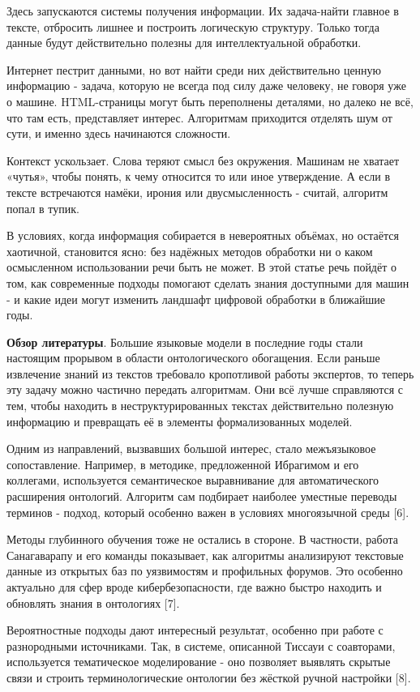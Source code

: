 \begin{multicols}{2}
Здесь запускаются системы получения информации. Их задача-найти главное
в тексте, отбросить лишнее и построить логическую структуру. Только
тогда данные будут действительно полезны для интеллектуальной обработки.

Интернет пестрит данными, но вот найти среди них действительно ценную
информацию - задача, которую не всегда под силу даже человеку, не говоря
уже о машине. HTML-страницы могут быть переполнены деталями, но далеко
не всё, что там есть, представляет интерес. Алгоритмам приходится
отделять шум от сути, и именно здесь начинаются сложности.

Контекст ускользает. Слова теряют смысл без окружения. Машинам не
хватает «чутья», чтобы понять, к чему относится то или иное утверждение.
А если в тексте встречаются намёки, ирония или двусмысленность - считай,
алгоритм попал в тупик.

В условиях, когда информация собирается в невероятных объёмах, но
остаётся хаотичной, становится ясно: без надёжных методов обработки ни о
каком осмысленном использовании речи быть не может. В этой статье речь
пойдёт о том, как современные подходы помогают сделать знания доступными
для машин - и какие идеи могут изменить ландшафт цифровой обработки в
ближайшие годы.

{\bfseries Обзор литературы}. Большие языковые модели в последние годы
стали настоящим прорывом в области онтологического обогащения. Если
раньше извлечение знаний из текстов требовало кропотливой работы
экспертов, то теперь эту задачу можно частично передать алгоритмам. Они
всё лучше справляются с тем, чтобы находить в неструктурированных
текстах действительно полезную информацию и превращать её в элементы
формализованных моделей.

Одним из направлений, вызвавших большой интерес, стало межъязыковое
сопоставление. Например, в методике, предложенной Ибрагимом и его
коллегами, используется семантическое выравнивание для автоматического
расширения онтологий. Алгоритм сам подбирает наиболее уместные переводы
терминов - подход, который особенно важен в условиях многоязычной среды
{[}6{]}.

Методы глубинного обучения тоже не остались в стороне. В частности,
работа Санагаварапу и его команды показывает, как алгоритмы анализируют
текстовые данные из открытых баз по уязвимостям и профильных форумов.
Это особенно актуально для сфер вроде кибербезопасности, где важно
быстро находить и обновлять знания в онтологиях {[}7{]}.

Вероятностные подходы дают интересный результат, особенно при работе с
разнородными источниками. Так, в системе, описанной Тиссауи с
соавторами, используется тематическое моделирование - оно позволяет
выявлять скрытые связи и строить терминологические онтологии без жёсткой
ручной настройки {[}8{]}.


\end{multicols}
